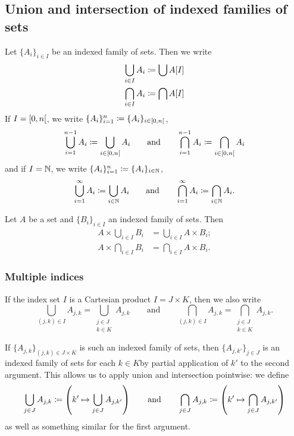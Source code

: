 \subsection{Union and intersection of indexed families of sets}
Let $\{A_i\}_{i\in I}$ be an indexed family of sets. Then we write
\begin{align*}
\bigcup_{i\in I} A_i &\coloneqq \bigcup A[I] \\
\bigcap_{i\in I} A_i &\coloneqq \bigcap A[I]
\end{align*}
If $I = \interval[co]{0,n}$, we write $\{A_i\}_{i=1}^{n} \defeq \{A_i\}_{i\in \interval[co]{0,n}}$,
\[ \bigcup_{i=1}^{n-1} A_i \defeq \bigcup_{i\in \interval[co]{0,n}} A_i \qquad \text{and} \qquad \bigcap_{i=1}^{n-1} A_i \defeq \bigcap_{i\in \interval[co]{0,n}} A_i \]
and if $I=\mathbb{N}$, we write $\{A_i\}_{i=1}^{n} \coloneqq \{A_i\}_{i\in \mathbb{N}}$,
\[ \bigcup_{i=1}^{\infty} A_i \coloneqq \bigcup_{i\in \mathbb{N}} A_i \qquad \text{and} \qquad \bigcap_{i=1}^{\infty} A_i \coloneqq \bigcap_{i\in \mathbb{N}} A_i. \]

\begin{lemma}
Let $A$ be a set and $\{B_i\}_{i\in I}$ an indexed family of sets. Then
\begin{align*}
A\times \bigcup_{i\in I} B_i &= \bigcup_{i\in I}A\times B_i; \\
A\times \bigcap_{i\in I} B_i &= \bigcap_{i\in I}A\times B_i.
\end{align*}
\end{lemma}

\subsubsection{Multiple indices}
If the index set $I$ is a Cartesian product $I=J\times K$, then we also write
\[ \bigcup_{(j,k)\in I} A_{j,k} = \bigcup_{\substack{j\in J \\ k\in K}} A_{j,k} \qquad\text{and}\qquad \bigcap_{(j,k)\in I} A_{j,k} = \bigcap_{\substack{j\in J \\ k\in K}} A_{j,k}. \]

If $\{A_{j,k}\}_{(j,k) \in J\times K}$ is such an indexed family of sets, then $\{A_{j,k'}\}_{j\in J}$ is an indexed family of sets for each $k\in K$by partial application of $k'$ to the second argument. This allows us to apply union and intersection pointwise: we define
\[ \bigcup_{j\in J}A_{j,k} \coloneqq \left(k'\mapsto \bigcup_{j\in J}A_{j,k'}\right) \qquad\text{and}\qquad \bigcap_{j\in J}A_{j,k} \coloneqq \left(k'\mapsto \bigcap_{j\in J}A_{j,k'}\right) \]
as well as something similar for the first argument.

